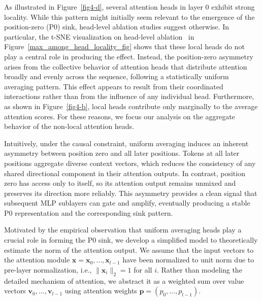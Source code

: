\documentclass[]{template}
\theoremstyle{plain}
\theoremstyle{definition}
\theoremstyle{remark}
\begin{document}
As illustrated in Figure~\ref{fig4-d}, several attention heads in layer 0 exhibit strong locality. While this pattern might initially seem relevant to the emergence of the position-zero (P0) sink, head-level ablation studies suggest otherwise. In particular, the t-SNE visualization on head-level ablation~\citep{cai2022theoreticalfoundationstsnevisualizing} in Figure~\ref{max_among_head_locality_fig} shows that these local heads do not play a central role in producing the effect. Instead, the position-zero asymmetry arises from the collective behavior of attention heads that distribute attention broadly and evenly across the sequence, following a statistically uniform averaging pattern. This effect appears to result from their coordinated interactions rather than from the influence of any individual head. Furthermore, as shown in Figure~\ref{fig4-b}, local heads contribute only marginally to the average attention scores. For these reasons, we focus our analysis on the aggregate behavior of the non-local attention heads.

Intuitively, under the causal constraint, uniform averaging induces an inherent asymmetry between position zero and all later positions. Tokens at all later positions aggregate diverse context vectors, which reduces the consistency of any shared directional component in their attention outputs. In contrast, position zero has access only to itself, so its attention output remains unmixed and preserves its direction more reliably. This asymmetry provides a clean signal that subsequent MLP sublayers can gate and amplify, eventually producing a stable P0 representation and the corresponding sink pattern.


Motivated by the empirical observation that uniform averaging heads play a crucial role in forming the P0 sink, we develop a simplified model to theoretically estimate the norm of the attention output. We assume that the input vectors to the attention module $\mathbf{x} = \mathbf{x}_0, \dots, \mathbf{x}_{l-1}$ have been normalized to unit norm due to pre-layer normalization, i.e., $\|\mathbf{x}_i\|_2 = 1$ for all $i$.
Rather than modeling the detailed mechanism of attention, we abstract it as a weighted sum over value vectors $\mathbf{v}_0, \dots, \mathbf{v}_{l-1}$ using attention weights $\mathbf{p} = (p_0, \dots, p_{l-1})$. 
\end{document}
